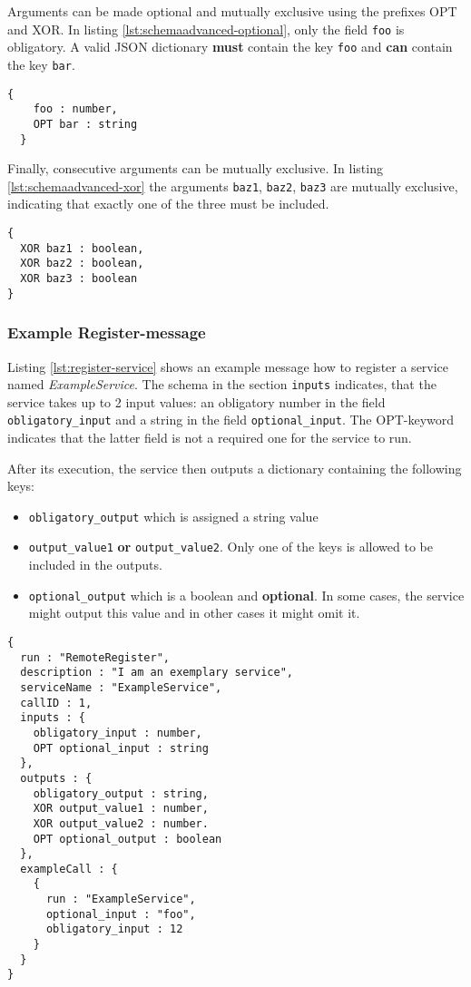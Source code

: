 Arguments can be made optional and mutually exclusive using the prefixes OPT and XOR. In listing \ref{lst:schemaadvanced-optional}, only the field \texttt{foo} is obligatory. A valid JSON dictionary \textbf{must} contain the key \texttt{foo} and \textbf{can} contain the key \texttt{bar}.
\begin{lstlisting}[caption={JSON Schema with optional arguments}, label={lst:schemaadvanced-optional}]
  {
    foo : number,
    OPT bar : string
  }
\end{lstlisting}

Finally, consecutive arguments can be mutually exclusive. In listing \ref{lst:schemaadvanced-xor} the arguments \texttt{baz1}, \texttt{baz2}, \texttt{baz3} are mutually exclusive, indicating that exactly one of the three must be included.
\begin{lstlisting}[caption={JSON Schema with mutually exclusive arguments}, label={lst:schemaadvanced-xor}]
{
  XOR baz1 : boolean,
  XOR baz2 : boolean,
  XOR baz3 : boolean
}
\end{lstlisting}

\subsubsection{Example Register-message}
Listing \ref{lst:register-service} shows an example message how to register a service named \emph{ExampleService}. The schema in the section \texttt{inputs} indicates, that the service takes up to 2 input values: an obligatory number in the field \texttt{obligatory\_input} and
a string in the field \texttt{optional\_input}. The OPT-keyword indicates that the latter field is not a required one for the service to run.

After its execution, the service then outputs a dictionary containing the following keys:
\begin{itemize}
  \item \texttt{obligatory\_output} which is assigned a string value
  \item \texttt{output\_value1} \textbf{or} \texttt{output\_value2}. Only one of the keys is allowed to be included in the outputs.
  \item \texttt{optional\_output} which is a boolean and \textbf{optional}. In some cases, the service might output this value and in other cases it might omit it.
\end{itemize}

\begin{lstlisting}[caption={Registering a service}, label={lst:register-service}]
{
  run : "RemoteRegister",
  description : "I am an exemplary service",
  serviceName : "ExampleService",
  callID : 1,
  inputs : {
    obligatory_input : number,
    OPT optional_input : string
  },
  outputs : {
    obligatory_output : string,
    XOR output_value1 : number,
    XOR output_value2 : number.
    OPT optional_output : boolean
  },
  exampleCall : {
    {
      run : "ExampleService",
      optional_input : "foo",
      obligatory_input : 12
    }
  }
}
\end{lstlisting}


